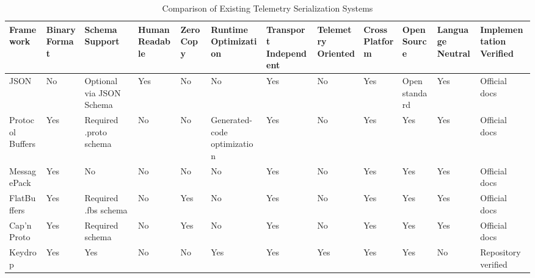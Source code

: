 \begin{table}[t]
\centering
\caption{Comparison of Existing Telemetry Serialization Systems}
\label{tab:comparison}
\scriptsize
\setlength{\tabcolsep}{3pt}
\renewcommand{\arraystretch}{1.15}
\begin{tabular}{|p{1.7cm}|p{1.25cm}|p{2.05cm}|p{1.35cm}|p{1.0cm}|p{2.0cm}|p{1.55cm}|p{1.45cm}|p{1.25cm}|p{1.2cm}|p{1.35cm}|p{1.75cm}|}
\hline
\textbf{Framework} & \textbf{Binary Format} & \textbf{Schema Support} & \textbf{Human Readable} & \textbf{Zero Copy} & \textbf{Runtime Optimization} & \textbf{Transport Independent} & \textbf{Telemetry Oriented} & \textbf{Cross Platform} & \textbf{Open Source} & \textbf{Language Neutral} & \textbf{Implementation Verified} \\
\hline
JSON & No & Optional via JSON Schema & Yes & No & No & Yes & No & Yes & Open standard & Yes & Official docs \\
\hline
Protocol Buffers & Yes & Required .proto schema & No & No & Generated-code optimization & Yes & No & Yes & Yes & Yes & Official docs \\
\hline
MessagePack & Yes & No & No & No & No & Yes & No & Yes & Yes & Yes & Official docs \\
\hline
FlatBuffers & Yes & Required .fbs schema & No & Yes & No & Yes & No & Yes & Yes & Yes & Official docs \\
\hline
Cap'n Proto & Yes & Required schema & No & Yes & No & Yes & No & Yes & Yes & Yes & Official docs \\
\hline
Keydrop & Yes & Yes & No & No & Yes & Yes & Yes & Yes & Yes & No & Repository verified \\
\hline
\end{tabular}
\end{table}
